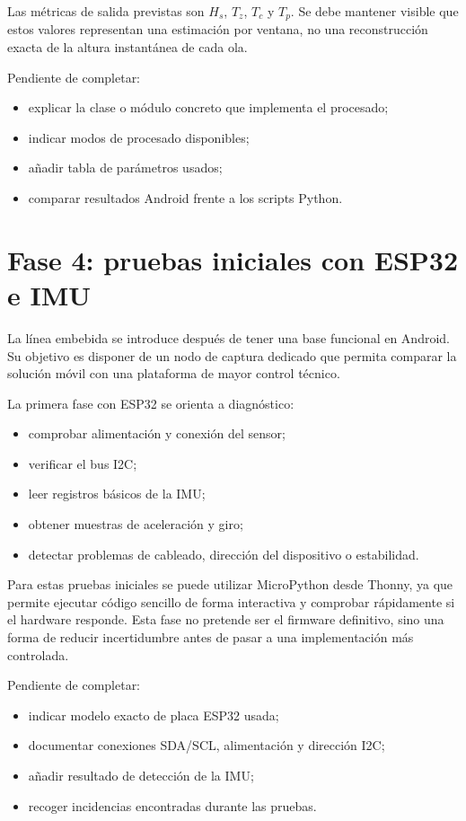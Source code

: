 Las métricas de salida previstas son \(H_s\), \(T_z\), \(T_c\) y \(T_p\). Se debe mantener visible que estos valores representan una estimación por ventana, no una reconstrucción exacta de la altura instantánea de cada ola.

\begin{temporalblock}
Pendiente de completar:
\begin{itemize}
  \item explicar la clase o módulo concreto que implementa el procesado;
  \item indicar modos de procesado disponibles;
  \item añadir tabla de parámetros usados;
  \item comparar resultados Android frente a los scripts Python.
\end{itemize}
\end{temporalblock}

\section{Fase 4: pruebas iniciales con ESP32 e IMU}

La línea embebida se introduce después de tener una base funcional en Android. Su objetivo es disponer de un nodo de captura dedicado que permita comparar la solución móvil con una plataforma de mayor control técnico.

La primera fase con ESP32 se orienta a diagnóstico:

\begin{itemize}
  \item comprobar alimentación y conexión del sensor;
  \item verificar el bus I2C;
  \item leer registros básicos de la IMU;
  \item obtener muestras de aceleración y giro;
  \item detectar problemas de cableado, dirección del dispositivo o estabilidad.
\end{itemize}

Para estas pruebas iniciales se puede utilizar MicroPython desde Thonny, ya que permite ejecutar código sencillo de forma interactiva y comprobar rápidamente si el hardware responde. Esta fase no pretende ser el firmware definitivo, sino una forma de reducir incertidumbre antes de pasar a una implementación más controlada.

\begin{temporalblock}
Pendiente de completar:
\begin{itemize}
  \item indicar modelo exacto de placa ESP32 usada;
  \item documentar conexiones SDA/SCL, alimentación y dirección I2C;
  \item añadir resultado de detección de la IMU;
  \item recoger incidencias encontradas durante las pruebas.
\end{itemize}
\end{temporalblock}

